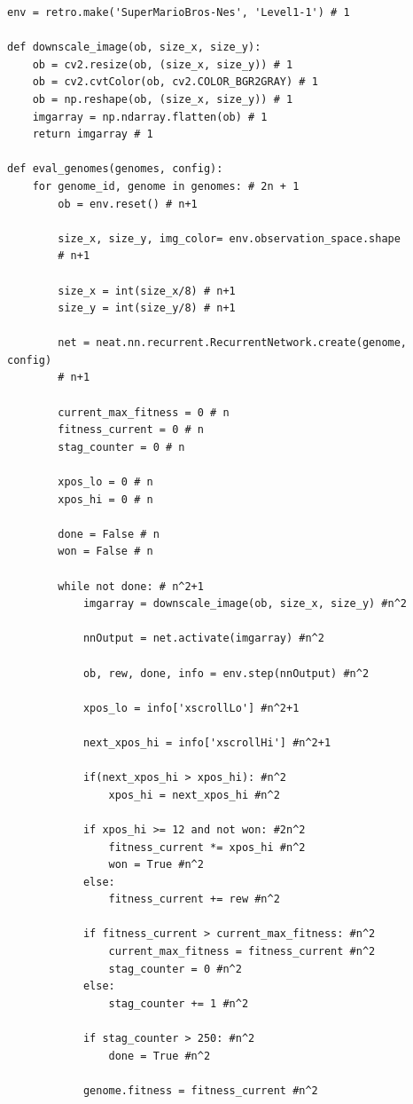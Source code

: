 \documentclass{article}
\begin{document}
\begin{verbatim}
env = retro.make('SuperMarioBros-Nes', 'Level1-1') # 1

def downscale_image(ob, size_x, size_y):
    ob = cv2.resize(ob, (size_x, size_y)) # 1
    ob = cv2.cvtColor(ob, cv2.COLOR_BGR2GRAY) # 1
    ob = np.reshape(ob, (size_x, size_y)) # 1
    imgarray = np.ndarray.flatten(ob) # 1
    return imgarray # 1

def eval_genomes(genomes, config):
    for genome_id, genome in genomes: # 2n + 1
        ob = env.reset() # n+1

        size_x, size_y, img_color= env.observation_space.shape
        # n+1

        size_x = int(size_x/8) # n+1
        size_y = int(size_y/8) # n+1

        net = neat.nn.recurrent.RecurrentNetwork.create(genome, config)
        # n+1

        current_max_fitness = 0 # n
        fitness_current = 0 # n
        stag_counter = 0 # n

        xpos_lo = 0 # n
        xpos_hi = 0 # n

        done = False # n
        won = False # n

        while not done: # n^2+1
            imgarray = downscale_image(ob, size_x, size_y) #n^2

            nnOutput = net.activate(imgarray) #n^2

            ob, rew, done, info = env.step(nnOutput) #n^2

            xpos_lo = info['xscrollLo'] #n^2+1

            next_xpos_hi = info['xscrollHi'] #n^2+1

            if(next_xpos_hi > xpos_hi): #n^2
                xpos_hi = next_xpos_hi #n^2

            if xpos_hi >= 12 and not won: #2n^2
                fitness_current *= xpos_hi #n^2
                won = True #n^2
            else:
                fitness_current += rew #n^2

            if fitness_current > current_max_fitness: #n^2
                current_max_fitness = fitness_current #n^2
                stag_counter = 0 #n^2
            else:
                stag_counter += 1 #n^2

            if stag_counter > 250: #n^2
                done = True #n^2

            genome.fitness = fitness_current #n^2


\end{verbatim}
\end{document}
